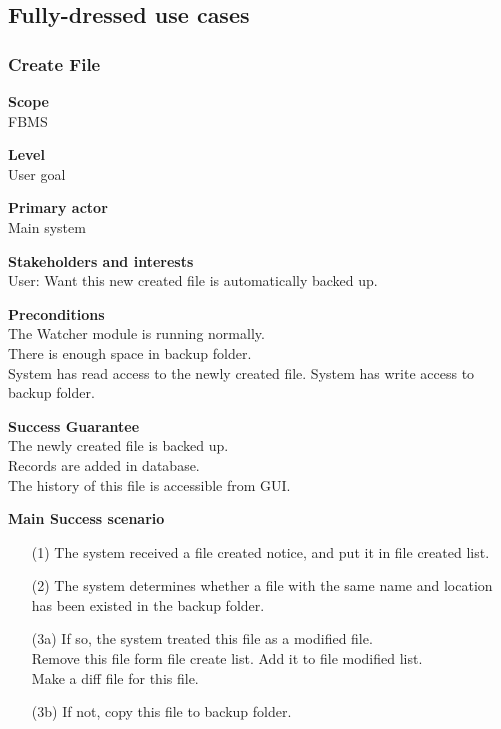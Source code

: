 \documentclass[12pt,a4paper]{article}
\begin{document}
\subsection{Fully-dressed use cases}
\subsubsection{Create File}
\begin{description}
	\item \textbf{Scope} \\
		FBMS
	\item \textbf{Level} \\
		User goal
	\item \textbf{Primary actor} \\
		Main system
	\item \textbf{Stakeholders and interests} \\
		User: Want this new created file is automatically backed up.
	\item \textbf{Preconditions} \\
		The Watcher module is running normally.\\
		There is enough space in backup folder.\\
		System has read access to the newly created file.
		System has write access to backup folder.
	\item \textbf{Success Guarantee} \\
		The newly created file is backed up.\\
		Records are added in database.\\
		The history of this file is accessible from GUI.
	\item \textbf{Main Success scenario} \vspace{-4ex} \\
	\begin{itemize}
		\item[(1)] The system received a file created notice, and put it in file created list.
		\item[(2)] The system determines whether a file with the same name and location has been existed in the backup folder.
		\item[(3a)] If so, the system treated this file as a modified file.\\
					Remove this file form file create list. Add it to file modified list.\\
					Make a diff file for this file.
		\item[(3b)] If not, copy this file to backup folder.

\end{itemize}
\end{description}
\end{document}
